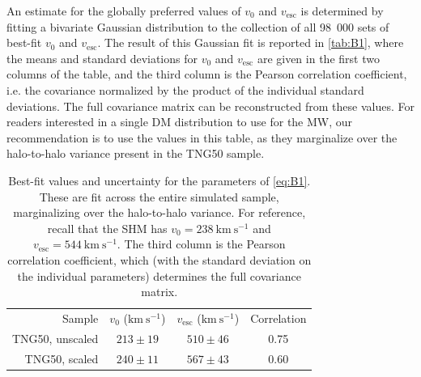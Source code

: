 \documentclass[aps,prl,reprint,superscriptaddress,nopreprintnumbers,nobibnotes,floatfix,longbibliography,footinbib]{revtex4-2}
\newcommand{\TNGfifty}{TNG50}
\newcommand{\vesc}{\ensuremath{v_\mathrm{esc}}}
\newcommand{\kms}{\ensuremath{\text{km}~\mathrm{s}^{-1}}}
\begin{document}
An estimate for the globally preferred values of $v_0$ and $\vesc{}$ is determined by fitting a bivariate Gaussian distribution to the collection of all 98~000 sets of best-fit $v_0$ and $\vesc{}$. The result of this Gaussian fit is reported in \autoref{tab:B1}, where the means and standard deviations for $v_0$ and $\vesc{}$ are given in the first two columns of the table, and the third column is the Pearson correlation coefficient, i.e. the covariance normalized by the product of the individual standard deviations. The full covariance matrix can be reconstructed from these values. For readers interested in a single DM distribution to use for the MW, our recommendation is to use the values in this table, as they marginalize over the halo-to-halo variance present in the \TNGfifty{} sample.
\FloatBarrier
\begin{table}
 \setcounter{section}{2}
 \caption{\label{tab:B1}Best-fit values and uncertainty for the parameters of \autoref{eq:B1}. These are fit across the entire simulated sample, marginalizing over the halo-to-halo variance. For reference, recall that the SHM has $v_0 = 238~\kms{}$ and $\vesc{}=544~\kms{}$. The third column is the Pearson correlation coefficient, which (with the standard deviation on the individual parameters) determines the full covariance matrix.}
\begin{ruledtabular}
 \begin{tabular}{rccc}
 Sample & $v_0$ (\kms{}) & $\vesc{}$ (\kms{}) & Correlation \\
 \colrule
 TNG50, unscaled & $213\pm 19$ & $510 \pm 46$ & 0.75\\
 TNG50, scaled & $240\pm 11$ & $567 \pm 43$ & 0.60\\
 \end{tabular}
\end{ruledtabular}
\setcounter{section}{1}
\end{table}
\end{document}
